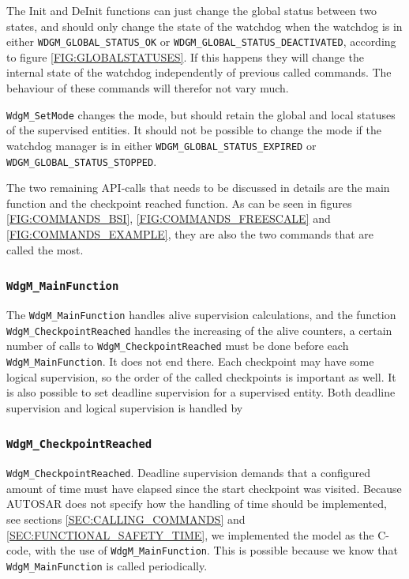 The Init and DeInit functions can just change the global status
between two states, and should only change the state of the watchdog
when the watchdog is in either \lstinline!WDGM_GLOBAL_STATUS_OK! or
\lstinline!WDGM_GLOBAL_STATUS_DEACTIVATED!, according to figure
\ref{FIG:GLOBALSTATUSES}. If this happens they will change the
internal state of the watchdog independently of previous called
commands. The behaviour of these commands will therefor not vary much.

\lstinline!WdgM_SetMode! changes the mode, but should retain the
global and local statuses of the supervised entities. It should not be
possible to change the mode if the watchdog manager is in either
\lstinline!WDGM_GLOBAL_STATUS_EXPIRED! or
\lstinline!WDGM_GLOBAL_STATUS_STOPPED!.

The two remaining API-calls that needs to be discussed in details are
the main function and the checkpoint reached function. As can be seen
in figures \ref{FIG:COMMANDS_BSI}, \ref{FIG:COMMANDS_FREESCALE} and
\ref{FIG:COMMANDS_EXAMPLE}, they are also the two commands that are
called the most.

\subsubsection{\lstinline!WdgM_MainFunction!}
The \lstinline!WdgM_MainFunction! handles alive supervision
calculations, and the function \lstinline!WdgM_CheckpointReached!
handles the increasing of the alive counters, a certain number of
calls to \lstinline!WdgM_CheckpointReached! must be done before each
\lstinline!WdgM_MainFunction!. It does not end there. Each checkpoint
may have some logical supervision, so the order of the called
checkpoints is important as well. It is also possible to set deadline
supervision for a supervised entity. Both deadline supervision and
logical supervision is handled by

\subsubsection{\lstinline!WdgM_CheckpointReached!}
\lstinline!WdgM_CheckpointReached!. Deadline supervision demands that
a configured amount of time must have elapsed since the start
checkpoint was visited. Because AUTOSAR does not specify how the
handling of time should be implemented, see sections
\ref{SEC:CALLING_COMMANDS} and \ref{SEC:FUNCTIONAL_SAFETY_TIME}, we
implemented the model as the C-code, with the use of
\lstinline!WdgM_MainFunction!. This is possible because we know that
\lstinline!WdgM_MainFunction! is called periodically.


